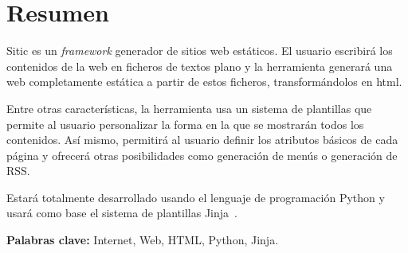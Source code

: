 \section*{Resumen}

Sitic es un \textit{framework} generador de sitios web estáticos. El usuario escribirá
los contenidos de la web en ficheros de textos plano y la
herramienta generará una web completamente estática a partir de estos ficheros,
transformándolos en html.

Entre otras características, la herramienta usa un sistema de plantillas que permite al
usuario personalizar la forma en la que se mostrarán todos los contenidos. 
Así mismo, permitirá al usuario definir los
atributos básicos de cada página y ofrecerá otras posibilidades como generación de menús
o generación de RSS.

Estará totalmente desarrollado usando el lenguaje de programación Python y usará como
base el sistema de plantillas Jinja~\cite{jinja}.

\textbf{Palabras clave:} Internet, Web, HTML, Python, Jinja.


